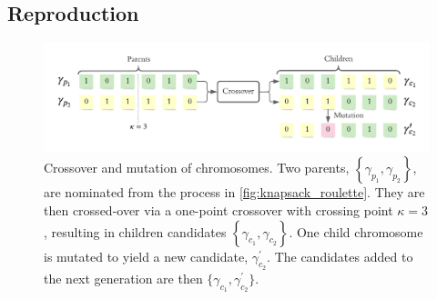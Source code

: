 \subsection{Reproduction}
\label{sec:reproduction}
\begin{figure}[t]
    \begin{center}
        \includegraphics{theoretical_study/figures/chromosomes.pdf}
    \end{center}
    \caption[Crossover and mutation of chromosomes]{
        Crossover and mutation of chromosomes.
        Two parents, $\left\{\gamma_{p_1}, \gamma_{p_2}\right\}$, are nominated from the process in \cref{fig:knapsack_roulette}. 
        They are then crossed-over via a one-point crossover with crossing point $\kappa=3$, 
        resulting in children candidates $\left\{\gamma_{c_1}, \gamma_{c_2}\right\}$. 
        One child chromosome is mutated to yield a new candidate, $\gamma_{c_2}^{\prime}$. 
        The candidates added to the next generation are then $\{ \gamma_{c_1}, \gamma_{c_2}^{\prime} \}$.
    }
    \label{fig:gen_alg_reproduction}
\end{figure}

